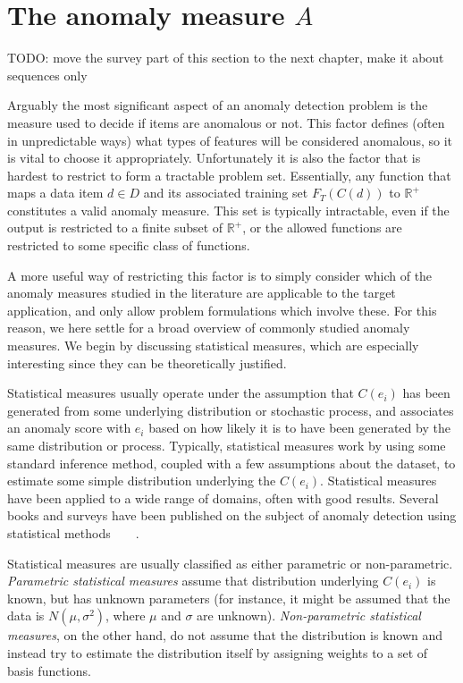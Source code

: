 \section{The anomaly measure $A$}
TODO: move the survey part of this section to the next chapter, make it about sequences only

Arguably the most significant aspect of an anomaly detection problem is the measure used to decide if items are anomalous or not. This factor defines (often in unpredictable ways) what types of features will be considered anomalous, so it is vital to choose it appropriately. Unfortunately it is also the factor that is hardest to restrict to form a tractable problem set. Essentially, any function that maps a data item $d \in D$ and its associated training set $F_T(C(d))$ to $\mathbb{R}^+$ constitutes a valid anomaly measure. This set is typically intractable, even if the output is restricted to a finite subset of $\mathbb{R}^+$, or the allowed functions are restricted to some specific class of functions.

A more useful way of restricting this factor is to simply consider which of the anomaly measures studied in the literature are applicable to the target application, and only allow problem formulations which involve these. For this reason, we here settle for a broad overview of commonly studied anomaly measures. We begin by discussing statistical measures, which are especially interesting since they can be theoretically justified.

Statistical measures usually operate under the assumption that $C(e_i)$ has been generated from some underlying distribution or stochastic process, and associates an anomaly score with $e_i$ based on how likely it is to have been generated by the same distribution or process. Typically, statistical measures work by using some standard inference method, coupled with a few assumptions about the dataset, to estimate some simple distribution underlying the $C(e_i)$. Statistical measures have been applied to a wide range of domains, often with good results. Several books and surveys have been published on the subject of anomaly detection using statistical methods~\cite{barnett}~\cite{bakar}~\cite{leroy}~\cite{hawkins}.

Statistical measures are usually classified as either parametric or non-parametric. \emph{Parametric statistical measures} assume that distribution underlying $C(e_i)$ is known, but has unknown parameters (for instance, it might be assumed that the data is $N(\mu, \sigma^2)$, where $\mu$ and $\sigma$ are unknown). \emph{Non-parametric statistical measures}, on the other hand, do not assume that the distribution is known and instead try to estimate the distribution itself by assigning weights to a set of basis functions.

